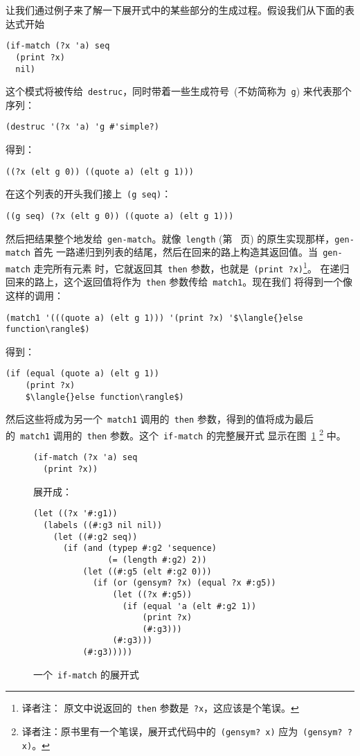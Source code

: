 让我们通过例子来了解一下展开式中的某些部分的生成过程。假设我们从下面的表达式开始
\begin{lstlisting}
(if-match (?x 'a) seq
  (print ?x)
  nil)
\end{lstlisting}
这个模式将被传给~\texttt{destruc}，同时带着一些生成符号~(不妨简称为~\texttt{g})
来代表那个序列：
\begin{lstlisting}
(destruc '(?x 'a) 'g #'simple?)
\end{lstlisting}
得到：
\begin{lstlisting}
((?x (elt g 0)) ((quote a) (elt g 1)))
\end{lstlisting}
在这个列表的开头我们接上~\texttt{(g seq)}：
\begin{lstlisting}
((g seq) (?x (elt g 0)) ((quote a) (elt g 1)))
\end{lstlisting}
然后把结果整个地发给~\texttt{gen-match}。就像~\texttt{length}
(第~\pageref{func:our-length_native} 页) 的原生实现那样，\texttt{gen-match} 首先
一路递归到列表的结尾，然后在回来的路上构造其返回值。当~\texttt{gen-match} 走完所有元素
时，它就返回其~\texttt{then} 参数，也就是~\texttt{(print ?x)}\footnote{译者注：
原文中说返回的~\texttt{then} 参数是~\texttt{?x}，这应该是个笔误。}。
在递归回来的路上，这个返回值将作为~\texttt{then} 参数传给~\texttt{match1}。现在我们
将得到一个像这样的调用：
\begin{lstlisting}
(match1 '(((quote a) (elt g 1))) '(print ?x) '$\langle{}else function\rangle$)
\end{lstlisting}
得到：
\begin{lstlisting}
(if (equal (quote a) (elt g 1))
    (print ?x)
    $\langle{}else function\rangle$)
\end{lstlisting}
然后这些将成为另一个~\texttt{match1} 调用的~\texttt{then} 参数，得到的值将成为最后
的~\texttt{match1} 调用的~\texttt{then} 参数。这个~\texttt{if-match} 的完整展开式
显示在图~\ref{fig:expansion_of_an_if-match}
\footnote{译者注：原书里有一个笔误，展开式代码中的~\texttt{(gensym? x)}
  应为~\texttt{(gensym? ?x)}。} 中。

\begin{figure}
\begin{lstlisting}
(if-match (?x 'a) seq
  (print ?x))
\end{lstlisting}
展开成：
\begin{lstlisting}
(let ((?x '#:g1))
  (labels ((#:g3 nil nil))
    (let ((#:g2 seq))
      (if (and (typep #:g2 'sequence)
               (= (length #:g2) 2))
          (let ((#:g5 (elt #:g2 0)))
            (if (or (gensym? ?x) (equal ?x #:g5))
                (let ((?x #:g5))
                  (if (equal 'a (elt #:g2 1))
                      (print ?x)
                      (#:g3)))
                (#:g3)))
          (#:g3)))))
\end{lstlisting}
  \caption{一个~\texttt{if-match} 的展开式}
  \label{fig:expansion_of_an_if-match}
\end{figure}

